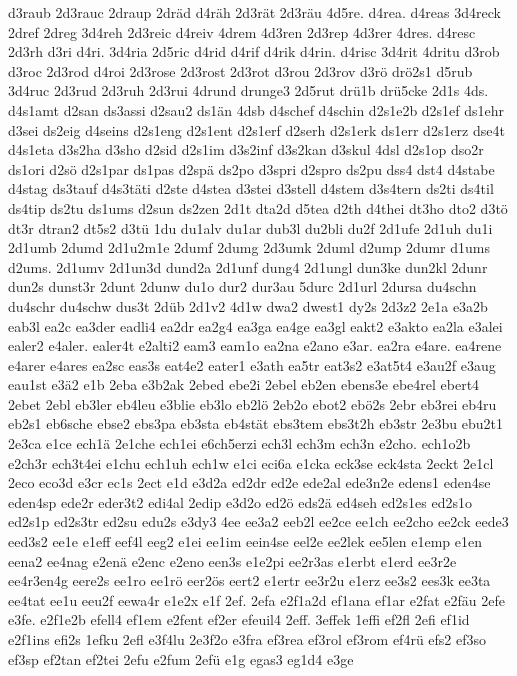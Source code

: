 {d3raub
2d3rauc
2draup
2dräd
d4räh
2d3rät
2d3räu
4d5re.
d4rea.
d4reas
3d4reck
2dref
2dreg
3d4reh
2d3reic
d4reiv
4drem
4d3ren
2d3rep
4d3rer
4dres.
d4resc
2d3rh
d3ri
d4ri.
3d4ria
2d5ric
d4rid
d4rif
d4rik
d4rin.
d4risc
3d4rit
4dritu
d3rob
d3roc
2d3rod
d4roi
2d3rose
2d3rost
2d3rot
d3rou
2d3rov
d3rö
drö2s1
d5rub
3d4ruc
2d3rud
2d3ruh
2d3rui
4drund
drunge3
2d5rut
drü1b
drü5cke
2d1s
4ds.
d4s1amt
d2san
ds3assi
d2sau2
ds1än
4dsb
d4schef
d4schin
d2s1e2b
d2s1ef
ds1ehr
d3sei
ds2eig
d4seins
d2s1eng
d2s1ent
d2s1erf
d2serh
d2s1erk
ds1err
d2s1erz
dse4t
d4s1eta
d3s2ha
d3sho
d2sid
d2s1im
d3s2inf
d3s2kan
d3skul
4dsl
d2s1op
dso2r
ds1ori
d2sö
d2s1par
ds1pas
d2spä
ds2po
d3spri
d2spro
ds2pu
dss4
dst4
d4stabe
d4stag
ds3tauf
d4s3täti
d2ste
d4stea
d3stei
d3stell
d4stem
d3s4tern
ds2ti
ds4til
ds4tip
ds2tu
ds1ums
d2sun
ds2zen
2d1t
dta2d
d5tea
d2th
d4thei
dt3ho
dto2
d3tö
dt3r
dtran2
dt5s2
d3tü
1du
du1alv
du1ar
dub3l
du2bli
du2f
2d1ufe
2d1uh
du1i
2d1umb
2dumd
2d1u2m1e
2dumf
2dumg
2d3umk
2duml
d2ump
2dumr
d1ums
d2ums.
2d1umv
2d1un3d
dund2a
2d1unf
dung4
2d1ungl
dun3ke
dun2kl
2dunr
dun2s
dunst3r
2dunt
2dunw
du1o
dur2
dur3au
5durc
2d1url
2dursa
du4schn
du4schr
du4schw
dus3t
2düb
2d1v2
4d1w
dwa2
dwest1
dy2s
2d3z2
2e1a
e3a2b
eab3l
ea2c
ea3der
eadli4
ea2dr
ea2g4
ea3ga
ea4ge
ea3gl
eakt2
e3akto
ea2la
e3alei
ealer2
e4aler.
ealer4t
e2alti2
eam3
eam1o
ea2na
e2ano
e3ar.
ea2ra
e4are.
ea4rene
e4arer
e4ares
ea2sc
eas3s
eat4e2
eater1
e3ath
ea5tr
eat3s2
e3at5t4
e3au2f
e3aug
eau1st
e3ä2
e1b
2eba
e3b2ak
2ebed
ebe2i
2ebel
eb2en
ebens3e
ebe4rel
ebert4
2ebet
2ebl
eb3ler
eb4leu
e3blie
eb3lo
eb2lö
2eb2o
ebot2
ebö2s
2ebr
eb3rei
eb4ru
eb2s1
eb6sche
ebse2
ebs3pa
eb3sta
eb4stät
ebs3tem
ebs3t2h
eb3str
2e3bu
ebu2t1
2e3ca
e1ce
ech1ä
2e1che
ech1ei
e6ch5erzi
ech3l
ech3m
ech3n
e2cho.
ech1o2b
e2ch3r
ech3t4ei
e1chu
ech1uh
ech1w
e1ci
eci6a
e1cka
eck3se
eck4sta
2eckt
2e1cl
2eco
eco3d
e3cr
ec1s
2ect
e1d
e3d2a
ed2dr
ed2e
ede2al
ede3n2e
edens1
eden4se
eden4sp
ede2r
eder3t2
edi4al
2edip
e3d2o
ed2ö
eds2ä
ed4seh
ed2s1es
ed2s1o
ed2s1p
ed2s3tr
ed2su
edu2s
e3dy3
4ee
ee3a2
eeb2l
ee2ce
ee1ch
ee2cho
ee2ck
eede3
eed3s2
ee1e
e1eff
eef4l
eeg2
e1ei
ee1im
eein4se
eel2e
ee2lek
ee5len
e1emp
e1en
eena2
ee4nag
e2enä
e2enc
e2eno
een3s
e1e2pi
ee2r3as
e1erbt
e1erd
ee3r2e
ee4r3en4g
eere2s
ee1ro
ee1rö
eer2ös
eert2
e1ertr
ee3r2u
e1erz
ee3s2
ees3k
ee3ta
ee4tat
ee1u
eeu2f
eewa4r
e1e2x
e1f
2ef.
2efa
e2f1a2d
ef1ana
ef1ar
e2fat
e2fäu
2efe
e3fe.
e2f1e2b
efell4
ef1em
e2fent
ef2er
efeuil4
2eff.
3effek
1effi
ef2fl
2efi
ef1id
e2f1ins
efi2s
1efku
2efl
e3f4lu
2e3f2o
e3fra
ef3rea
ef3rol
ef3rom
ef4rü
efs2
ef3so
ef3sp
ef2tan
ef2tei
2efu
e2fum
2efü
e1g
egas3
eg1d4
e3ge
}
